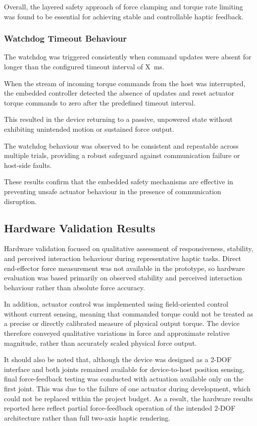 Overall, the layered safety approach of force clamping and torque rate limiting was found to be essential for achieving stable and controllable haptic feedback.
\subsubsection{Watchdog Timeout Behaviour}

The watchdog was triggered consistently when command updates were absent for longer than the configured timeout interval of X~ms.

When the stream of incoming torque commands from the host was interrupted, the embedded controller detected the absence of updates and reset actuator torque commands to zero after the predefined timeout interval.

This resulted in the device returning to a passive, unpowered state without exhibiting unintended motion or sustained force output.

The watchdog behaviour was observed to be consistent and repeatable across multiple trials, providing a robust safeguard against communication failure or host-side faults.

These results confirm that the embedded safety mechanisms are effective in preventing unsafe actuator behaviour in the presence of communication disruption.

\subsection{Hardware Validation Results}

Hardware validation focused on qualitative assessment of responsiveness, stability, and perceived interaction behaviour during representative haptic tasks. Direct end-effector force measurement was not available in the prototype, so hardware evaluation was based primarily on observed stability and perceived interaction behaviour rather than absolute force accuracy.

In addition, actuator control was implemented using field-oriented control without current sensing, meaning that commanded torque could not be treated as a precise or directly calibrated measure of physical output torque. The device therefore conveyed qualitative variations in force and approximate relative magnitude, rather than accurately scaled physical force output.

It should also be noted that, although the device was designed as a 2-DOF interface and both joints remained available for device-to-host position sensing, final force-feedback testing was conducted with actuation available only on the first joint. This was due to the failure of one actuator during development, which could not be replaced within the project budget. As a result, the hardware results reported here reflect partial force-feedback operation of the intended 2-DOF architecture rather than full two-axis haptic rendering.

